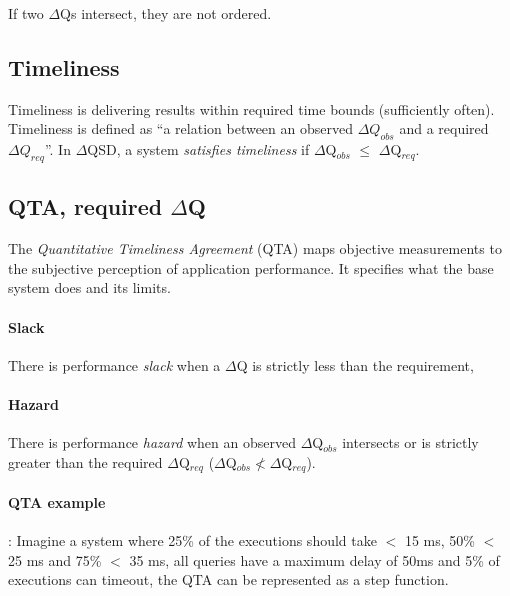         If two $\Delta$Qs intersect, they are not ordered. \cite{dq-tut}

    \subsection{Timeliness}
        Timeliness is delivering results within required time bounds (sufficiently often).
        Timeliness is defined as ``a relation between an observed $\Delta Q_{obs}$ and a required $\Delta Q_{req}$''. 
        In $\Delta$QSD, a system \textit{satisfies timeliness} if $\Delta$Q$_{obs}$ $\le$ $\Delta$Q$_{req}$. \cite{art}
     
    \subsection{QTA, required $\Delta$Q}
         The \textit{Quantitative Timeliness Agreement} (QTA) maps objective measurements to the subjective perception of application performance. It specifies what the base system does and its limits. \cite{dq-br}
    
    \paragraph{Slack} There is performance \textit{slack} when a $\Delta$Q is strictly less than the requirement,

        \paragraph{Hazard} There is performance \textit{hazard} when an observed $\Delta$Q$_{obs}$ intersects or is strictly greater than the required $\Delta$Q$_{req}$ ($\Delta$Q$_{obs} \nless \Delta$Q$_{req}$). \cite{myo}
 
    \paragraph{QTA example}: Imagine a system where 25\% of the executions should take $<$ 15 ms, 50\% $<$ 25 ms and 75\% $<$ 35 ms, all queries have a maximum delay of 50ms and 5\% of executions can timeout, the QTA can be represented as a step function.
    
